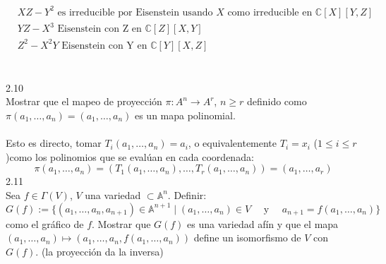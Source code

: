 \documentclass{article}
\newcommand{\A}{\mathbb{A}}
\newcommand{\C}{\mathbb{C}}
\begin{document}
\begin{equation*}
\begin{aligned}
    &XZ-Y^2 \text{ es irreducible por Eisenstein usando $X$ como irreducible en } \C[X][Y,Z] \\
    &YZ-X^3 \text{ Eisenstein con Z en } \C[Z][X,Y] \\
    &Z^2-X^2Y \text{ Eisenstein con Y en } \C[Y][X,Z]
\end{aligned}
\end{equation*}
\\
\\
2.10
\\
Mostrar que el mapeo de proyección $\pi:A^n \to A^r$, $n \geq r$ definido como $\pi(a_1,\dots, a_n)=(a_1,\dots,a_n)$ es un mapa polinomial.
\\
\\
Esto es directo, tomar $T_i(a_{1},\dots,a_n)=a_i$, o equivalentemente $T_i=x_i$ ($1 \leq i \leq r$)como los polinomios que se evalúan en cada coordenada:
\begin{equation*}
    \pi(a_1,\dots,a_n)=(T_1(a_1,\dots,a_n),\dots,T_r(a_1,\dots,a_n))=(a_1,\dots,a_r)
\end{equation*}
2.11
\\
Sea $f \in \Gamma(V)$, $V$ una variedad $\subset \A^n$. Definir:
\begin{equation*}
    G(f):=\{(a_1,\dots,a_n,a_{n+1}) \in \A^{n+1} \mid (a_1,\dots,a_n) \in V \quad \text{ y } \quad a_{n+1}=f(a_1,\dots,a_n)\}
\end{equation*}
como el gráfico de $f$. Mostrar que $G(f)$ es una variedad afín y que el mapa $(a_1,\dots,a_n) \mapsto (a_1,\dots,a_n,f(a_1,\dots,a_n))$ define un isomorfismo de $V$ con $G(f)$. (la proyección da la inversa)
\end{document}
